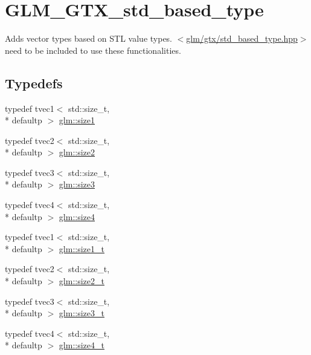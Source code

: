 \hypertarget{group__gtx__std__based__type}{\section{G\-L\-M\-\_\-\-G\-T\-X\-\_\-std\-\_\-based\-\_\-type}
\label{group__gtx__std__based__type}
}


Adds vector types based on S\-T\-L value types. $<$\hyperlink{std__based__type_8hpp}{glm/gtx/std\-\_\-based\-\_\-type.\-hpp}$>$ need to be included to use these functionalities.  


\subsection*{Typedefs}
\begin{DoxyCompactItemize}
\item 
typedef tvec1$<$ std\-::size\-\_\-t, \\*
defaultp $>$ \hyperlink{group__gtx__std__based__type_ga3550330d27cef40f7694130b501be73a}{glm\-::size1}
\item 
typedef tvec2$<$ std\-::size\-\_\-t, \\*
defaultp $>$ \hyperlink{group__gtx__std__based__type_gab8b434ee2ba109726915e977c6aca22a}{glm\-::size2}
\item 
typedef tvec3$<$ std\-::size\-\_\-t, \\*
defaultp $>$ \hyperlink{group__gtx__std__based__type_gacf3e47fc09ad812f100e13442919fc79}{glm\-::size3}
\item 
typedef tvec4$<$ std\-::size\-\_\-t, \\*
defaultp $>$ \hyperlink{group__gtx__std__based__type_ga66a39603f01a37444de3adb28c021e79}{glm\-::size4}
\item 
typedef tvec1$<$ std\-::size\-\_\-t, \\*
defaultp $>$ \hyperlink{group__gtx__std__based__type_ga9a9525491009d0df7bcc964b1e2e5745}{glm\-::size1\-\_\-t}
\item 
typedef tvec2$<$ std\-::size\-\_\-t, \\*
defaultp $>$ \hyperlink{group__gtx__std__based__type_ga47b1e2bca519b02eb8500a240216b5de}{glm\-::size2\-\_\-t}
\item 
typedef tvec3$<$ std\-::size\-\_\-t, \\*
defaultp $>$ \hyperlink{group__gtx__std__based__type_ga689991bc66c16637f043ade5cbb87260}{glm\-::size3\-\_\-t}
\item 
typedef tvec4$<$ std\-::size\-\_\-t, \\*
defaultp $>$ \hyperlink{group__gtx__std__based__type_gaa4f69cfac1c3e014a50fd090974092ec}{glm\-::size4\-\_\-t}
\end{DoxyCompactItemize}


